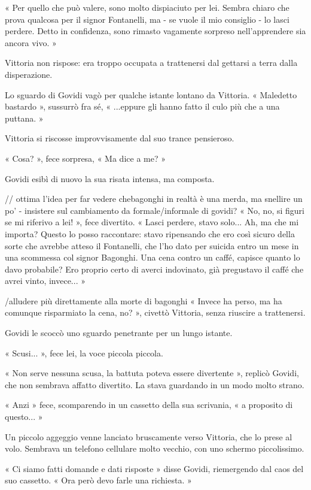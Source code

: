 « Per quello che può valere, sono molto dispiaciuto per lei. Sembra chiaro che prova qualcosa per il signor Fontanelli, ma - se vuole il mio consiglio - lo lasci perdere. Detto in confidenza, sono rimasto vagamente sorpreso nell'apprendere sia ancora vivo. »

Vittoria non rispose: era troppo occupata a trattenersi dal gettarsi a terra dalla disperazione.

Lo sguardo di Govidi vagò per qualche istante lontano da Vittoria. « Maledetto bastardo », sussurrò fra sé, « ...eppure gli hanno fatto il culo più che a una puttana. »

Vittoria si riscosse improvvisamente dal suo trance pensieroso.

« Cosa? », fece sorpresa, « Ma dice a me? »

Govidi esibì di nuovo la sua risata intensa, ma composta.

// ottima l'idea per far vedere chebagonghi in realtà è una merda, ma snellire un po' - insistere sul cambiamento da formale/informale di govidi?
« No, no, si figuri se mi riferivo a lei! », fece divertito. « Lasci perdere, stavo solo... Ah, ma che mi importa? Questo lo posso raccontare: stavo ripensando che ero così sicuro della sorte che avrebbe atteso il Fontanelli, che l'ho dato per suicida entro un mese in una scommessa col signor Bagonghi. Una cena contro un caffé, capisce quanto lo davo probabile? Ero proprio certo di averci indovinato, già pregustavo il caffé che avrei vinto, invece... »

/alludere più direttamente alla morte di bagonghi
« Invece ha perso, ma ha comunque risparmiato la cena, no? », civettò Vittoria, senza riuscire a trattenersi.

Govidi le scoccò uno sguardo penetrante per un lungo istante.

« Scusi... », fece lei, la voce piccola piccola.

« Non serve nessuna scusa, la battuta poteva essere divertente », replicò Govidi, che non sembrava affatto divertito. La stava guardando in un modo molto strano.

« Anzi » fece, scomparendo in un cassetto della sua scrivania, « a proposito di questo... »

Un piccolo aggeggio venne lanciato bruscamente verso Vittoria, che lo prese al volo. Sembrava un telefono cellulare molto vecchio, con uno schermo piccolissimo.

« Ci siamo fatti domande e dati risposte » disse Govidi, riemergendo dal caos del suo cassetto. « Ora però devo farle una richiesta. »

